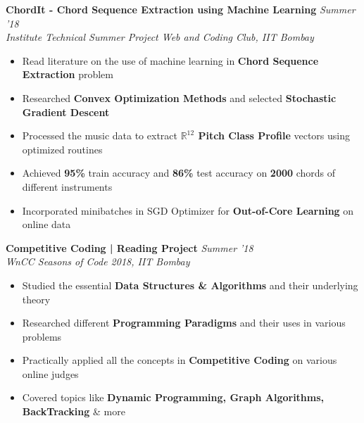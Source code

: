 \documentclass[11pt]{article}%
\begin{document}
{\flushleft \bf \large{ChordIt - Chord Sequence Extraction using Machine Learning}} \hfill {{{\em {Summer '18}}}}\\
{\em{Institute Technical Summer Project \textbar Web and Coding Club, IIT Bombay}}
\begin{itemize}
\vspace{-0.2cm}
\setlength\itemsep{0.01em}
\item Read literature on the use of machine learning in {\bf Chord Sequence Extraction} problem
\vspace{-1.2mm}
\item Researched {\bf Convex Optimization Methods} and selected {\bf Stochastic Gradient Descent}
\vspace{-1.2mm}
\item  Processed the music data to extract {\bf $\mathbb{R}^{12}$ Pitch Class Profile} vectors using optimized routines
\vspace{-1.2mm}
\item Achieved {\bf 95\%} train accuracy and {\bf 86\%} test accuracy on {\bf 2000} chords of different instruments
\vspace{-1.2mm}
\item  Incorporated minibatches in SGD Optimizer for {\bf Out-of-Core Learning} on online data
\vspace{-1.2mm}
\end{itemize}
\vspace{-4mm}

{\flushleft \bf \large{Competitive Coding | Reading Project}} \hfill {{{\em{Summer '18}}}} \\
{\em{WnCC Seasons of Code 2018, IIT Bombay}}
\vspace{-1mm}
\begin{itemize}
\setlength\itemsep{0.01em}
\vspace{-1mm}
\item Studied the essential {\bf Data Structures \& Algorithms} and their underlying theory 
\vspace{-1mm}
\item Researched different {\bf Programming Paradigms} and their uses in various problems
\vspace{-1mm}
\item Practically applied all the concepts in {\bf Competitive Coding} on various online judges
\vspace{-1mm}
\item Covered topics like {\bf Dynamic Programming, Graph Algorithms, BackTracking} \& more
\end{itemize}
\vspace{-0.5cm}
\end{document}
